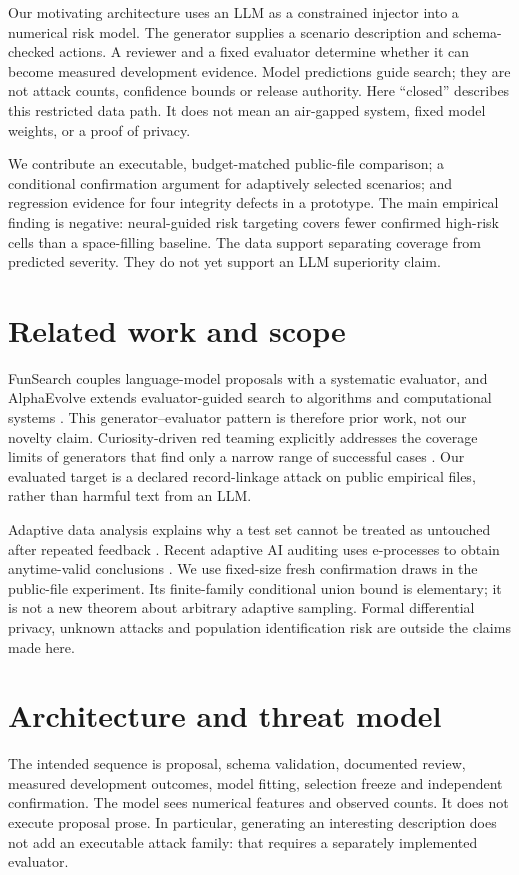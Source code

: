 \documentclass[11pt]{article}
\begin{document}
Our motivating architecture uses an LLM as a constrained injector into a numerical risk model. The generator supplies a scenario description and schema-checked actions. A reviewer and a fixed evaluator determine whether it can become measured development evidence. Model predictions guide search; they are not attack counts, confidence bounds or release authority. Here ``closed'' describes this restricted data path. It does not mean an air-gapped system, fixed model weights, or a proof of privacy.

We contribute an executable, budget-matched public-file comparison; a conditional confirmation argument for adaptively selected scenarios; and regression evidence for four integrity defects in a prototype. The main empirical finding is negative: neural-guided risk targeting covers fewer confirmed high-risk cells than a space-filling baseline. The data support separating coverage from predicted severity. They do not yet support an LLM superiority claim.

\section{Related work and scope}
FunSearch couples language-model proposals with a systematic evaluator, and AlphaEvolve extends evaluator-guided search to algorithms and computational systems \cite{funsearch,alphaevolve}. This generator--evaluator pattern is therefore prior work, not our novelty claim. Curiosity-driven red teaming explicitly addresses the coverage limits of generators that find only a narrow range of successful cases \cite{curiosity}. Our evaluated target is a declared record-linkage attack on public empirical files, rather than harmful text from an LLM.

Adaptive data analysis explains why a test set cannot be treated as untouched after repeated feedback \cite{holdout}. Recent adaptive AI auditing uses e-processes to obtain anytime-valid conclusions \cite{zhou}. We use fixed-size fresh confirmation draws in the public-file experiment. Its finite-family conditional union bound is elementary; it is not a new theorem about arbitrary adaptive sampling. Formal differential privacy, unknown attacks and population identification risk are outside the claims made here.

\section{Architecture and threat model}
The intended sequence is proposal, schema validation, documented review, measured development outcomes, model fitting, selection freeze and independent confirmation. The model sees numerical features and observed counts. It does not execute proposal prose. In particular, generating an interesting description does not add an executable attack family: that requires a separately implemented evaluator.
\end{document}
